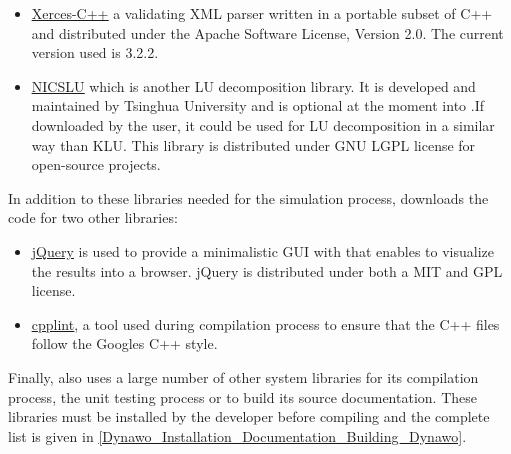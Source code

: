 \documentclass[a4paper, 12pt]{report}
\begin{document}
\begin{itemize}
\item \href{http://xerces.apache.org/xerces-c/}{\underline{Xerces-C++}} a validating XML parser written in a portable subset of C++ and distributed under the Apache Software License, Version 2.0. The current version used is 3.2.2.

\item \href{http://nicslu.weebly.com/} {\underline{NICSLU}} \cite{chenNicsLu} which is another LU decomposition library. It is developed and maintained by Tsinghua University and is optional at the moment into \Dynawo .If downloaded by the user, it could be used for LU decomposition in a similar way than KLU. This library is distributed under GNU LGPL license for open-source projects.
\end{itemize}

In addition to these libraries needed for the simulation process, \Dynawo downloads the code for two other libraries:
\begin{itemize}
\item \href{https://jquery.com/}{\underline{jQuery}} is used to provide a minimalistic GUI with \Dynawo that enables to visualize the results into a browser. jQuery is distributed under both a MIT and GPL license.
\item \href{https://github.com/google/styleguide/tree/gh-pages/cpplint}{\underline{cpplint}}, a tool used during \Dynawo compilation process to ensure that the C++ files follow the Google\textquotesingle s C++ style.
\end{itemize}

Finally, \Dynawo also uses a large number of other system libraries for its compilation process, the unit testing process or to build its source documentation. These libraries must be installed by the developer before compiling \Dynawo and the complete list is given in \ref{Dynawo_Installation_Documentation_Building_Dynawo}.



\end{document}
